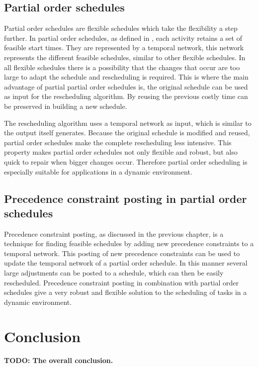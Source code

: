 \documentclass{article}
\newcommand{\TODO}[1]{{\color{red}\textbf{TODO: #1}}}
\begin{document}
\subsection{Partial order schedules}
Partial order schedules are flexible schedules which take the flexibility a step further.
In partial order schedules, as defined in \citet{policella07}, each activity retains a set of feasible start times.
They are represented by a temporal network, this network represents the different feasible schedules, similar to other flexible schedules.
In all flexible schedules there is a possibility that the changes that occur are too large to adapt the schedule and rescheduling is required.
This is where the main advantage of partial partial order schedules is, the original schedule can be used as input for the rescheduling algorithm.
By reusing the previous costly time can be preserved in building a new schedule.

The rescheduling algorithm uses a temporal network as input, which is similar to the output itself generates.
Because the original schedule is modified and reused, partial order schedules make the complete rescheduling less intensive.
This property makes partial order schedules not only flexible and robust, but also quick to repair when bigger changes occur.
Therefore partial order scheduling is especially suitable for applications in a dynamic environment.

\subsection{Precedence constraint posting in partial order schedules}
Precedence constraint posting, as discussed in the previous chapter, is a technique for finding feasible schedules by adding new precedence constraints to a temporal network.
This posting of new precedence constraints can be used to update the temporal network of a partial order schedule.
In this manner several large adjustments can be posted to a schedule, which can then be easily rescheduled.
Precedence constraint posting in combination with partial order schedules give a very robust and flexible solution to the scheduling of tasks in a dynamic environment.


\newpage

\section{Conclusion}
\TODO{The overall conclusion.}

\newpage


\end{document}
